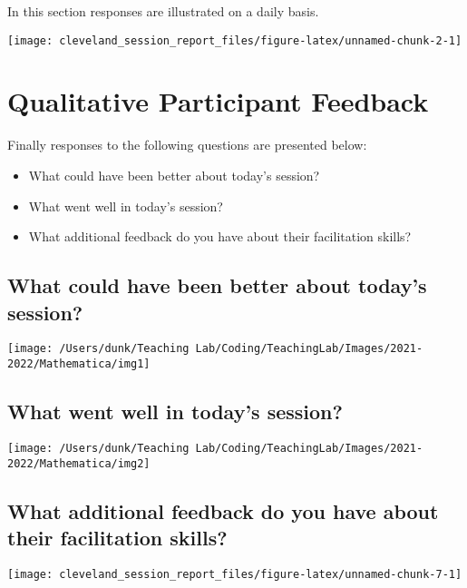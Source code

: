 \documentclass[10,a4paperpaper,]{article}
\begin{document}
In this section responses are illustrated on a daily basis.

\begin{center}\texttt{[image: cleveland\_session\_report\_files/figure-latex/unnamed-chunk-2-1]} \end{center}

\section{Qualitative Participant Feedback}

Finally responses to the following questions are presented below:

\begin{itemize}
\item
  What could have been better about today's session?
\item
  What went well in today's session?
\item
  What additional feedback do you have about their facilitation skills?
\end{itemize}

\subsection{What could have been better about today's session?}

\begin{center}\texttt{[image: /Users/dunk/Teaching Lab/Coding/TeachingLab/Images/2021-2022/Mathematica/img1]} \end{center}

\subsection{What went well in today's session?}

\begin{center}\texttt{[image: /Users/dunk/Teaching Lab/Coding/TeachingLab/Images/2021-2022/Mathematica/img2]} \end{center}

\subsection{What additional feedback do you have about their facilitation skills?}

\begin{center}\texttt{[image: cleveland\_session\_report\_files/figure-latex/unnamed-chunk-7-1]} \end{center}
\end{document}
